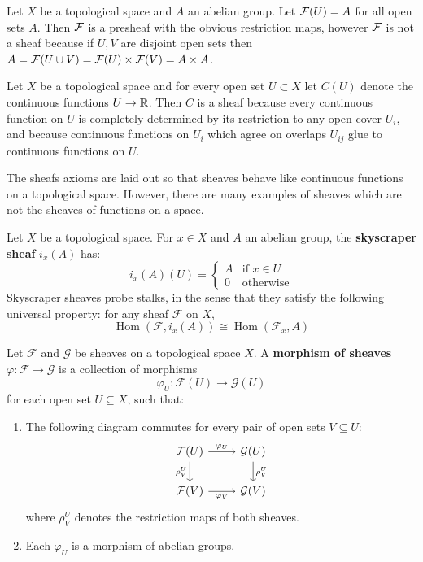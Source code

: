 \documentclass[12pt]{article}
\begin{document}
\begin{example}
    Let $X$ be a topological space and $A$ an abelian group. Let ${\mathcal{F}}(U) = A$ for all open sets $A$. Then ${\mathcal{F}}$ is a presheaf with the obvious restriction maps, however ${\mathcal{F}}$ is not a sheaf because if $U,V$ are disjoint open sets then $A = {\mathcal{F}}(U \cup V) = {\mathcal{F}}(U)\times {\mathcal{F}}(V) = A\times A$.
\end{example}

\begin{example}
    Let $X$ be a topological space and for every open set $U\subset X$ let $C(U)$ denote the continuous functions $U\to \mathbb{R}$. Then $C$ is a sheaf because every continuous function on $U$ is completely determined by its restriction to any open cover $U_i$, and because continuous functions on $U_i$ which agree on overlaps $U_{ij}$ glue to continuous functions on $U$.
\end{example}

The sheafs axioms are laid out so that sheaves behave like continuous functions on a topological space. However, there are many examples of sheaves which are not the sheaves of functions on a space.

\begin{example}
    Let $X$ be a topological space. For $x \in X$ and $A$ an abelian group, the \textbf{skyscraper sheaf} $i_x(A)$ has:
    \[
        i_x(A)(U) =
        \begin{cases}
            A & \text{if } x \in U \\
            0 & \text{otherwise}
        \end{cases}
    \]
    Skyscraper sheaves probe stalks, in the sense that they satisfy the following universal property: for any sheaf $\mathcal{F}$ on $X$, \[
        \operatorname{Hom}(\mathcal F,i_x(A))
        \cong
        \operatorname{Hom}(\mathcal F_x,A)\]
\end{example}

\begin{definition}
    Let $\mathcal{F}$ and $\mathcal{G}$ be sheaves on a topological space $X$. A \textbf{morphism of sheaves} $\varphi: \mathcal{F} \to \mathcal{G}$ is a collection of morphisms
    \[
        \varphi_U: \mathcal{F}(U) \to \mathcal{G}(U)
    \]
    for each open set $U \subseteq X$, such that:
    \begin{enumerate}
        \item The following diagram commutes for every pair of open sets $V \subseteq U$:
              \[
                  \begin{tikzcd}
                      \mathcal{F}(U) \ar[r, "\varphi_U"] \ar[d, "\rho^U_V"'] & \mathcal{G}(U) \ar[d, "\rho^U_V"] \\
                      \mathcal{F}(V) \ar[r, "\varphi_V"'] & \mathcal{G}(V)
                  \end{tikzcd}
              \]
              where $\rho^U_V$ denotes the restriction maps of both sheaves.

        \item Each $\varphi_U$ is a morphism of abelian groups.
    \end{enumerate}
\end{definition}
\end{document}
